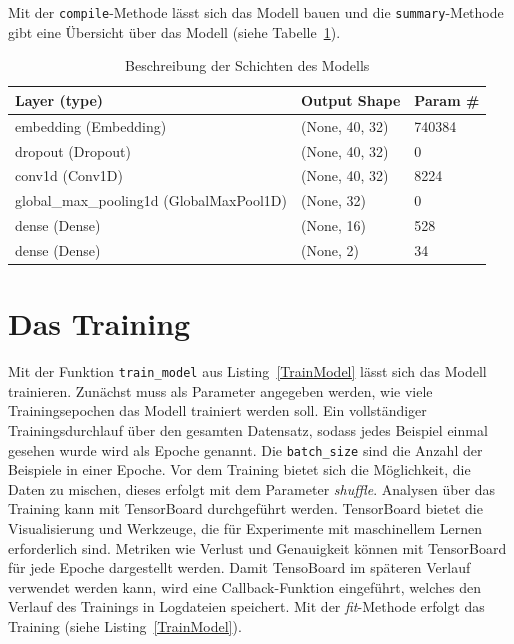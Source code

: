 Mit der \texttt{compile}-Methode lässt sich das Modell bauen und die \texttt{summary}-Methode gibt eine Übersicht über das Modell (siehe Tabelle~\ref{modellBesch}).


\begin{table}[h]
    \caption{Beschreibung der Schichten des Modells}
    \label{modellBesch}
    \renewcommand{\arraystretch}{1.2}
    \centering
    \sffamily
    \begin{footnotesize}
        \begin{tabular}{l l l}
            \toprule
            \textbf{Layer (type)}                  & \textbf{Output Shape} & \textbf{Param \#} \\
            \midrule
            embedding (Embedding)  & (None, 40, 32) & 740384                \\
            dropout (Dropout)  & (None, 40, 32) &     0      \\
            conv1d (Conv1D)                  & (None, 40, 32)     &    8224     \\
            global\_max\_pooling1d (GlobalMaxPool1D)   & (None, 32)                    &     0   \\
            dense (Dense)    & (None, 16)     &  528      \\
            dense (Dense)   & (None, 2)     & 34                      \\
            \bottomrule
        \end{tabular}
    \end{footnotesize}
    \rmfamily
\end{table}

\section{Das Training}

Mit der Funktion \texttt{train\_model} aus Listing~\ref{TrainModel} lässt sich das Modell trainieren. Zunächst muss als Parameter angegeben werden, wie viele Trainingsepochen das Modell trainiert werden soll. Ein vollständiger Trainingsdurchlauf über den gesamten Datensatz, sodass jedes Beispiel einmal gesehen wurde wird als Epoche genannt. Die \texttt{batch\_size} sind die Anzahl der Beispiele in einer Epoche. Vor dem Training bietet sich die Möglichkeit, die Daten zu mischen, dieses erfolgt mit dem Parameter \textit{shuffle}. Analysen über das Training kann mit TensorBoard durchgeführt werden. TensorBoard bietet die Visualisierung und Werkzeuge, die für Experimente mit maschinellem Lernen erforderlich sind. Metriken wie Verlust und Genauigkeit können mit TensorBoard für jede Epoche dargestellt werden. Damit TensoBoard im späteren Verlauf verwendet werden kann, wird eine Callback-Funktion eingeführt, welches den Verlauf des Trainings in Logdateien speichert. Mit der \textit{fit}-Methode erfolgt das Training (siehe Listing~\ref{TrainModel}).


